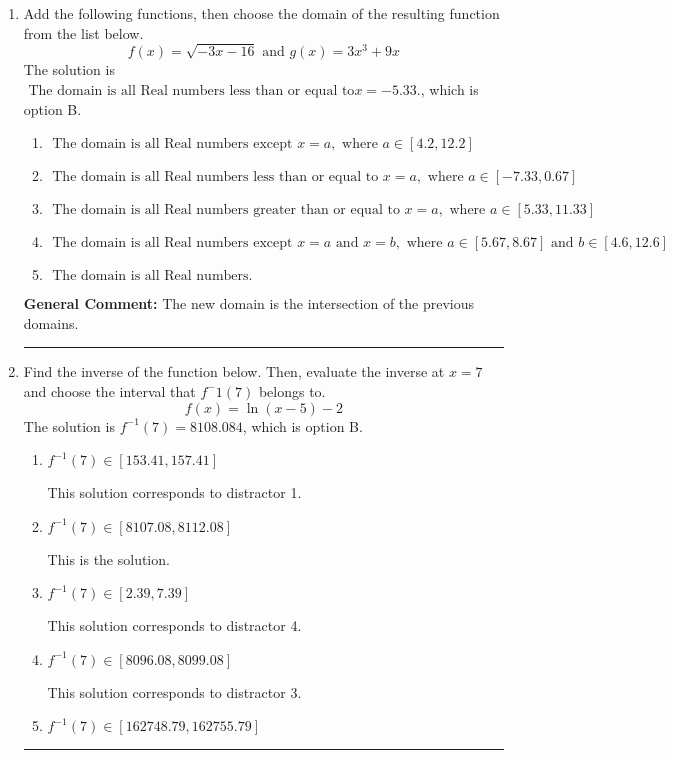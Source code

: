 \documentclass{extbook}[14pt]
\newcommand{\litem}[1]{\item #1

\rule{\textwidth}{0.4pt}}
\begin{document}
\begin{enumerate}\litem{
Add the following functions, then choose the domain of the resulting function from the list below.
\[ f(x) = \sqrt{-3x-16}  \text{ and } g(x) = 3x^{3} +9 x \]The solution is \( \text{ The domain is all Real numbers less than or equal to} x = -5.33. \), which is option B.\begin{enumerate}[label=\Alph*.]
\item \( \text{ The domain is all Real numbers except } x = a, \text{ where } a \in [4.2, 12.2] \)


\item \( \text{ The domain is all Real numbers less than or equal to } x = a, \text{ where } a \in [-7.33, 0.67] \)


\item \( \text{ The domain is all Real numbers greater than or equal to } x = a, \text{ where } a \in [5.33, 11.33] \)


\item \( \text{ The domain is all Real numbers except } x = a \text{ and } x = b, \text{ where } a \in [5.67, 8.67] \text{ and } b \in [4.6, 12.6] \)


\item \( \text{ The domain is all Real numbers. } \)


\end{enumerate}

\textbf{General Comment:} The new domain is the intersection of the previous domains.
}
\litem{
Find the inverse of the function below. Then, evaluate the inverse at $x = 7$ and choose the interval that $f^-1(7)$ belongs to.
\[ f(x) = \ln{(x-5)}-2 \]The solution is \( f^{-1}(7) = 8108.084 \), which is option B.\begin{enumerate}[label=\Alph*.]
\item \( f^{-1}(7) \in [153.41, 157.41] \)

 This solution corresponds to distractor 1.
\item \( f^{-1}(7) \in [8107.08, 8112.08] \)

 This is the solution.
\item \( f^{-1}(7) \in [2.39, 7.39] \)

 This solution corresponds to distractor 4.
\item \( f^{-1}(7) \in [8096.08, 8099.08] \)

 This solution corresponds to distractor 3.
\item \( f^{-1}(7) \in [162748.79, 162755.79] \)


\end{enumerate}}
\end{enumerate}
\end{document}
